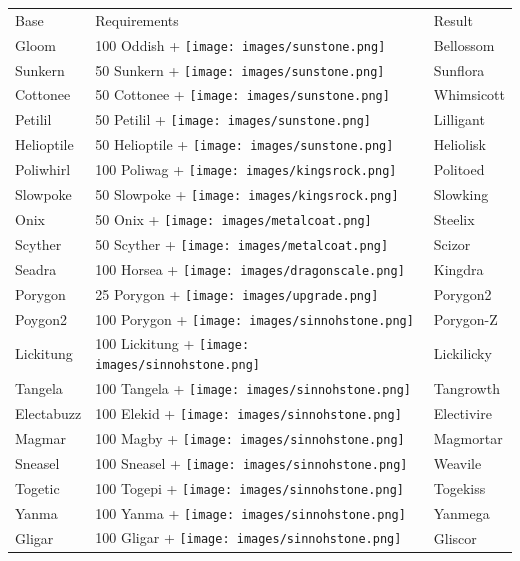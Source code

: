 \begin{table}
\footnotesize
\centering
  \begin{tabular}{lll}
    Base & Requirements & Result \\
    \Midrule
    Gloom & 100 Oddish + \texttt{[image: images/sunstone.png]} & Bellossom \\
    Sunkern & 50 Sunkern + \texttt{[image: images/sunstone.png]} & Sunflora \\
    Cottonee & 50 Cottonee + \texttt{[image: images/sunstone.png]} & Whimsicott \\
    Petilil & 50 Petilil + \texttt{[image: images/sunstone.png]} & Lilligant \\
    Helioptile & 50 Helioptile + \texttt{[image: images/sunstone.png]} & Heliolisk \\
    Poliwhirl & 100 Poliwag + \texttt{[image: images/kingsrock.png]} & Politoed \\
    Slowpoke & 50 Slowpoke + \texttt{[image: images/kingsrock.png]} & Slowking \\
    Onix & 50 Onix + \texttt{[image: images/metalcoat.png]} & Steelix \\
    Scyther & 50 Scyther + \texttt{[image: images/metalcoat.png]} & Scizor \\
    Seadra & 100 Horsea + \texttt{[image: images/dragonscale.png]} & Kingdra \\
    Porygon & 25 Porygon + \texttt{[image: images/upgrade.png]} & Porygon2 \\
    Poygon2 & 100 Porygon + \texttt{[image: images/sinnohstone.png]} & Porygon-Z \\
    Lickitung & 100 Lickitung + \texttt{[image: images/sinnohstone.png]} & Lickilicky \\
    Tangela	& 100 Tangela + \texttt{[image: images/sinnohstone.png]} & Tangrowth \\
    Electabuzz & 100 Elekid + \texttt{[image: images/sinnohstone.png]} & Electivire	\\
    Magmar & 100 Magby + \texttt{[image: images/sinnohstone.png]} & Magmortar	\\
    Sneasel & 100 Sneasel + \texttt{[image: images/sinnohstone.png]} & Weavile	\\
    Togetic & 100 Togepi + \texttt{[image: images/sinnohstone.png]} & Togekiss	\\
    Yanma & 100 Yanma + \texttt{[image: images/sinnohstone.png]} & Yanmega	\\
    Gligar & 100 Gligar + \texttt{[image: images/sinnohstone.png]} & Gliscor	\\

\end{tabular}
\end{table}
